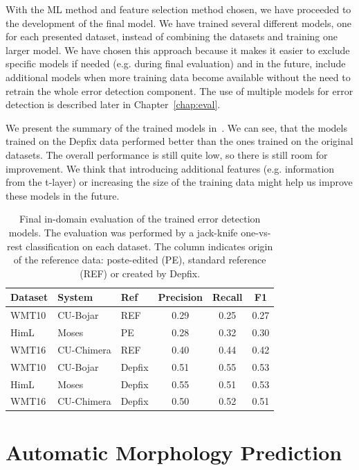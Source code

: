 With the ML method and feature selection method chosen, we have proceeded to 
the development of the final model.
We have trained several different models, one for each presented dataset, instead of combining
the datasets and training one larger model. We have chosen this approach because it makes
it easier to exclude specific models if needed (e.g. during final evaluation) and in the
future, include additional models when more training data become available without the need
to retrain the whole error detection component. The use of multiple models for error detection
is described later in Chapter~\ref{chap:eval}.

We present the summary of the trained models in~. We can see, that the models
trained on the Depfix data performed better than the ones trained on the original datasets. The overall
performance is still quite low, so there is still room for improvement. We think that introducing
additional features (e.g. information from the t-layer) or increasing the size of the training data
might help us improve these models in the future.

\begin{table}[t]
\centering
\small

\begin{tabular}{lll|ccc}
Dataset  &  System  &  Ref  &  Precision  &  Recall  &  F1  \\
\hline
WMT10  &   CU-Bojar  &  REF  &  0.29  &  0.25  &  0.27  \\
HimL  &  Moses  &  PE  &  0.28  &  0.32  &  0.30  \\
WMT16  &  CU-Chimera  &  REF  &  0.40  &  0.44  &  0.42  \\
WMT10  &  CU-Bojar  &  Depfix  &  0.51  &  0.55  &  0.53  \\
HimL  &  Moses  &  Depfix  &  0.55  &  0.51  &  0.53  \\
WMT16  &  CU-Chimera  &  Depfix  &  0.50  &  0.52  &  0.51  \\
\end{tabular}
\caption{
    Final in-domain evaluation of the trained error detection models. The evaluation was performed
by a jack-knife one-vs-rest classification on each dataset. The  column indicates origin
of the reference data: poste-edited (PE), standard reference (REF) or created by Depfix.
}
\label{wf-summary}
\end{table}


\section{Automatic Morphology Prediction}


